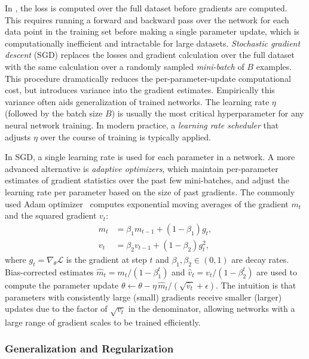 In , the loss is computed over the full dataset before gradients are computed.
This requires running a forward and backward pass over the network for each data point in the training set before making a single parameter update, which is computationally inefficient and intractable for large datasets.
\textit{Stochastic gradient descent} (SGD) replaces the losses and gradient calculation over the full dataset with the same calculation over a randomly sampled \textit{mini-batch} of $B$ examples.
This procedure dramatically reduces the per-parameter-update computational cost, but introduces variance into the gradient estimates.
Empirically this variance often aids generalization of trained networks.
The learning rate $\eta$ (followed by the batch size $B$) is usually the most critical hyperparameter for any neural network training.
In modern practice, a \textit{learning rate scheduler} that adjusts $\eta$ over the course of training is typically applied.

In SGD, a single learning rate is used for each parameter in a network.
A more advanced alternative is \textit{adaptive optimizers}, which maintain per-parameter estimates of gradient statistics over the past few mini-batches, and adjust the learning rate per parameter based on the size of past gradients.
The commonly used Adam optimizer~\cite{kingma2014adam} computes exponential moving averages of the gradient $m_t$ and the squared gradient $v_t$:
\begin{align}
    m_t &= \beta_1 m_{t-1} + (1 - \beta_1) g_t, \label{eqn:adam_m} \\
    v_t &= \beta_2 v_{t-1} + (1 - \beta_2) g_t^2, \label{eqn:adam_v}
\end{align}
where $g_t = \nabla_\theta \mathcal{L}$ is the gradient at step $t$ and $\beta_1, \beta_2 \in (0,1)$ are decay rates.
Bias-corrected estimates $\hat{m}_t = m_t / (1 - \beta_1^t)$ and $\hat{v}_t = v_t / (1-\beta_2^t)$ are used to compute the parameter update $\theta \leftarrow \theta - \eta \, \hat{m}_t / (\sqrt{\hat{v}_t} + \epsilon)$.
The intuition is that parameters with consistently large (small) gradients receive smaller (larger) updates due to the factor of $\sqrt{v_t}$ in the denominator, allowing networks with a large range of gradient scales to be trained efficiently.

\subsubsection{Generalization and Regularization}

